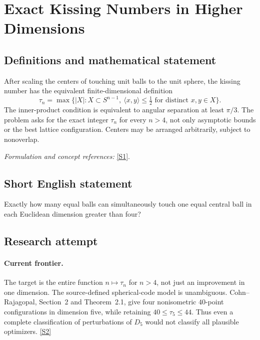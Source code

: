 \documentclass[11pt,a4paper]{article}
\newcommand{\sref}[2]{\hyperlink{source:#1:#2}{[S#2]}}
\newif\ifshowcatalogue
\newcommand{\cataloguescope}[1]{\ifshowcatalogue
 \paragraph{Exact scope in the supplied catalogue.}
 \begin{quote}\small #1\end{quote}\fi}
\numberwithin{equation}{section}
\begin{document}
\setcounter{section}{109}
\clearpage
\section{\texorpdfstring{Exact Kissing Numbers in Higher Dimensions}{Exact Kissing Numbers in Higher Dimensions}}\label{110}
\subsection{Definitions and mathematical statement}
After scaling the centers of touching unit balls to the unit sphere, the kissing number has the equivalent finite-dimensional definition
\[
 \tau_n=\max\bigl\{|X|:X\subset S^{n-1},\ \langle x,y\rangle\le\tfrac12
                                  \text{ for distinct }x,y\in X\bigr\}.
\]
The inner-product condition is equivalent to angular separation at least $\pi/3$. The problem asks for the exact integer $\tau_n$ for every $n>4$, not only asymptotic bounds or the best lattice configuration. Centers may be arranged arbitrarily, subject to nonoverlap.
\par\smallskip\textit{Formulation and concept references:} \sref{110}{1}.
\cataloguescope{For every integer n > 4, determine the exact kissing number tau\_n: the maximum number of pairwise nonoverlapping unit balls in Euclidean R\textasciicircum{}n that can touch a central unit ball of the same radius.}
\subsection{Short English statement}
Exactly how many equal balls can simultaneously touch one equal central ball in each Euclidean dimension greater than four?
\subsection{Research attempt}

\paragraph{Current frontier.}
The target is the entire function $n\mapsto\tau_n$ for $n>4$, not just
an improvement in one dimension. The source-defined spherical-code model
is unambiguous. Cohn--Rajagopal, Section~2 and Theorem~2.1, give four
nonisometric $40$-point configurations in dimension five, while retaining
$40\leq\tau_5\leq44$. Thus even a complete classification of perturbations
of $D_5$ would not classify all plausible optimizers. \sref{110}{2}
\end{document}

